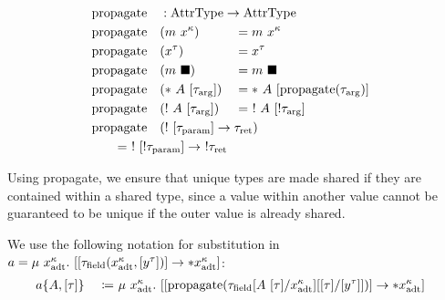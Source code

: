 \newcommand{\propagate}{\mathrm{propagate}}
\begin{alignat*}{3}
  &\propagate &&: \mathrlap{\AttrType \to \AttrType} \\
  &\propagate&&(m\ x^\kappa) &&= m\ x^\kappa \\
  &\propagate&&(x^\tau) &&= x^\tau \\
  &\propagate&&(m\ \blacksquare) &&= m\ \blacksquare \\
  &\propagate&&(*\ A\ [\tau_\arrg]) &&= *\ A\ [\propagate(\tau_\arrg)] \\
  &\propagate&&(!\ A\ [\tau_\arrg]) &&= \ !\ A\ [!\tau_\arrg] \\
  &\propagate&&\mathrlap{(!\ [\tau_\param] \to \tau_\ret)} \\
  &\rebreak{= \ !\ [!\tau_\param] \to\ !\tau_\ret}
\end{alignat*}

Using propagate, we ensure that unique types are made shared if they are contained within a shared type, since a value within another value cannot be guaranteed to be unique if the outer value is already shared. 

We use the following notation for substitution in $a = \mu\ x^\kappa_\adt.\ [[\tau_\field(x^\kappa_\adt, [y^\tau])] \to *x^\kappa_\adt]$:
\begin{alignat*}{3}
	a\{A, [\tau]\}\ &&\coloneqq&\ \mu\ x^\kappa_\adt.\ [[\propagate(\tau_\field[A\ [\tau]/x^\kappa_\adt][[\tau]/[y^\tau]])] \to *x^\kappa_\adt]
\end{alignat*}

